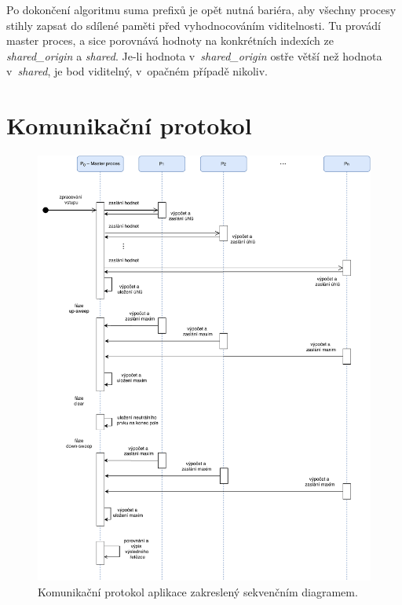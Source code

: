 \documentclass[11pt, a4paper, titlepage]{article}
\begin{document}
Po dokončení algoritmu suma prefixů je opět nutná
bariéra, aby všechny procesy stihly zapsat do sdílené paměti před
vyhodnocováním viditelnosti.
Tu provádí master proces, a sice porovnává hodnoty na konkrétních
indexích ze \textit{shared\_origin} a \textit{shared}.
Je-li hodnota v~\textit{shared\_origin} ostře větší než hodnota
v~\textit{shared}, je bod viditelný, v~opačném případě nikoliv.


\section{Komunikační protokol}\label{sec:protokol}

\begin{figure}[H]
    \centering
    \includegraphics[width=.99\textwidth]{diagram.pdf}
    \caption{Komunikační protokol aplikace zakreslený sekvenčním diagramem.}
\end{figure}
\end{document}
